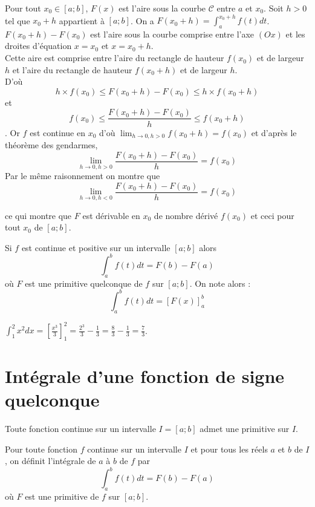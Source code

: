 \documentclass[french]{book}
\begin{document}
\begin{demo}
Pour tout $x_0\in [a;b]$, $F(x)$ est l'aire sous la courbe $\mathcal{C}$ entre $a$ et $x_0$. Soit $h>0$ tel que $x_0+h$ appartient à $[a;b]$. On a $F(x_0+h)=\int_{a}^{x_0+h}f(t)dt$.\\
$F(x_0+h)-F(x_0)$ est l'aire sous la courbe comprise entre l'axe $(Ox)$ et les droites d'équation $x=x_0$ et $x=x_0+h$.\\
Cette aire est comprise entre l'aire du rectangle de hauteur $f(x_0)$ et de largeur $h$ et l'aire du rectangle de hauteur $f(x_0+h)$ et de largeur $h$.\\
D'où $$h\times f(x_0)\leq F(x_0+h)-F(x_0)\leq h\times f(x_0+h)$$
et $$f(x_0)\leq\frac{F(x_0+h)-F(x_0)}{h}\leq f(x_0+h)$$.
Or $f$ est continue en $x_0$ d'où $\lim_{h\rightarrow 0,h>0}f(x_0+h)=f(x_0)$ et d'après le théorème des gendarmes,
$$\lim_{h\rightarrow 0,h>0}\frac{F(x_0+h)-F(x_0)}{h}=f(x_0)$$
Par le même raisonnement on montre que $$\lim_{h\rightarrow 0,h<0}\frac{F(x_0+h)-F(x_0)}{h}=f(x_0)$$

ce qui montre que $F$ est dérivable en $x_0$ de nombre dérivé $f(x_0)$ et ceci pour tout $x_0$ de $[a;b]$.
\end{demo}

\newpage


\begin{prop}
 Si $f$ est continue et positive sur un intervalle $[a;b]$ alors
$$\int_{a}^{b}f(t)dt=F(b)-F(a)$$
où $F$ est une primitive quelconque de $f$ sur $[a;b]$. On note alors :
$$\int_{a}^{b}f(t)dt=[F(x)]_{a}^{b}$$
\end{prop}


\begin{exemple}
$\int_{1}^{2}x^2dx=[\frac{x^3}{3}]_{1}^{2}=\frac{2^3}{3}-\frac{1}{3}=\frac{8}{3}-\frac{1}{3}=\frac{7}{3}$.
\end{exemple}




\section{Intégrale d'une fonction de signe quelconque}


\begin{thm}
Toute fonction continue sur un intervalle $I=[a;b]$ admet une primitive sur $I$.
\end{thm}


\begin{thm}[et définition]
 Pour toute fonction $f$ continue sur un intervalle $I$ et pour tous les réels $a$ et $b$ de $I$, on définit l'intégrale de $a$ à $b$ de $f$ par $$\int_{a}^{b}f(t)dt=F(b)-F(a)$$
 où $F$ est une primitive de $f$ sur $[a;b]$.
\end{thm}
\end{document}
